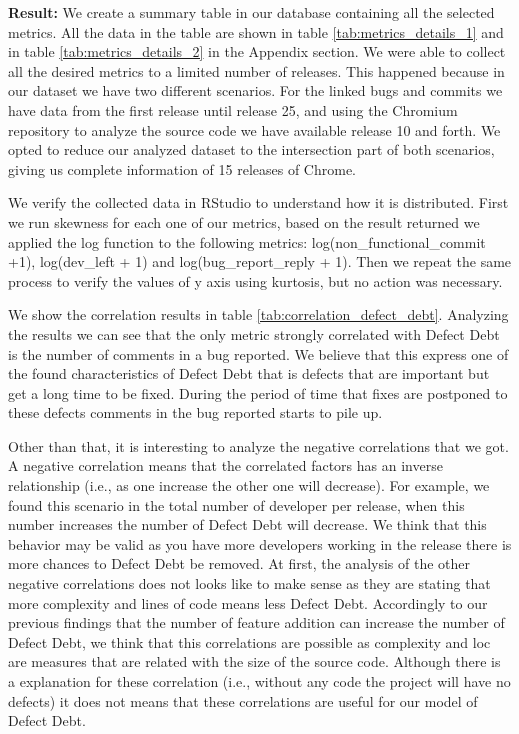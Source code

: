 \vspace{1mm}
\noindent\textbf{Result:} We create a summary table in our database containing all the selected metrics. All the data in the table are shown in table \ref{tab:metrics_details_1} and in table \ref{tab:metrics_details_2} in the Appendix section. We were able to collect all the desired metrics to a limited number of releases. This happened because in our dataset we have two different scenarios. For the linked bugs and commits we have data from the first release until release 25, and using the Chromium repository to analyze the source code we have available release 10 and forth. We opted to reduce our analyzed dataset to the intersection part of both scenarios,  giving us complete information of 15 releases of Chrome.

We verify the collected data in RStudio to understand how it is distributed. First we run skewness for each one of our metrics, based on the result returned we applied the log function to the following metrics:  log(non\_functional\_commit +1), log(dev\_left + 1) and  log(bug\_report\_reply + 1). Then we repeat the same process to verify the values of y axis using kurtosis, but no action was necessary. 

We show the correlation results in table \ref{tab:correlation_defect_debt}.  Analyzing the results we can see that the only metric strongly correlated with Defect Debt is the number of comments in a bug reported. We believe that this express one of the found characteristics of Defect Debt that is defects that are important but get a long time to be fixed. During the period of time that fixes are postponed to these defects comments in the bug reported starts to pile up. 

Other than that, it is interesting to analyze the negative correlations that we got. A negative correlation means that the correlated factors has an inverse relationship (i.e., as one increase the other one will decrease). For
 example, we found this scenario in the total number of developer per release, when this number increases the number of Defect Debt will decrease. We think that this behavior may be valid as you have more developers working in the release there is more chances to Defect Debt be removed. At first, the analysis of the other negative correlations does not looks like to make sense as they are stating that more complexity and lines of code means less Defect Debt. Accordingly to our previous findings that the number of feature addition can increase the number of Defect Debt, we think that this correlations are possible as complexity and loc are measures that are related with the size of the source code. Although there is a explanation for these correlation (i.e., without any code the project will have no defects) it does not means that these correlations are useful for our model of Defect Debt. 

